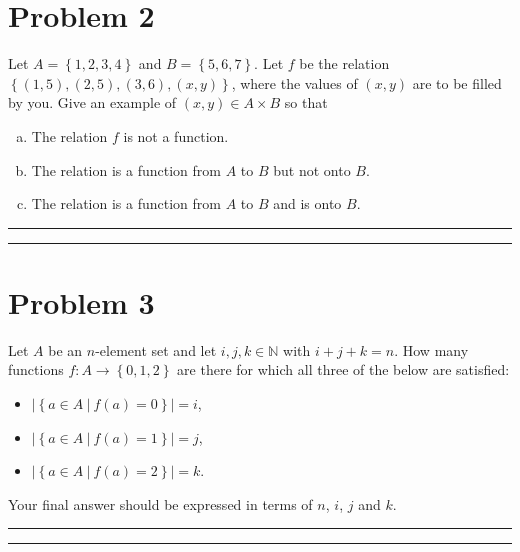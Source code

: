 \documentclass{article}
\theoremstyle{definition}
\newenvironment{solution}{\bigskip\hrule{\hfill}}{\bigskip\hrule{\hfill}} %
\begin{document}
\newpage


\section*{Problem 2}
Let $A=\left\{1,2,3,4\right\}$ and $B=\left\{5,6,7\right\}$. Let $f$ be the relation $\left\{\left(1,5\right),\left(2,5\right),\left(3,6\right),\left(x,y\right)\right\}$, where the values of $\left(x,y\right)$ are to be filled by you. Give an example of $\left(x,y\right)\in A\times B$ so that
\begin{enumerate}[a)] %
    \item The relation $f$ is not a function.
    \item The relation is a function from $A$ to $B$ but not onto $B$.
    \item The relation is a function from $A$ to $B$ and is onto $B$.
\end{enumerate}
\begin{solution}


\end{solution}


\newpage


\section*{Problem 3}
Let $A$ be an $n$-element set and let $i,j,k\in\mathbb{N}$ with $i+j+k=n$. How many functions $f:A\longrightarrow\left\{0,1,2\right\}$ are there for which all three of the below are satisfied:
\begin{itemize}
    \item $\left|\left\{a\in A~\big\vert~f\left(a\right)=0\right\}\right|=i$,
    \item $\left|\left\{a\in A~\big\vert~f\left(a\right)=1\right\}\right|=j$,
    \item $\left|\left\{a\in A~\big\vert~f\left(a\right)=2\right\}\right|=k$.
\end{itemize}
Your final answer should be expressed in terms of $n$, $i$, $j$ and $k$.
\begin{solution}


\end{solution}
\end{document}
